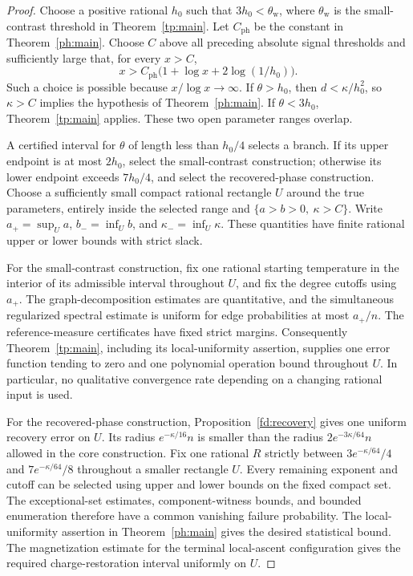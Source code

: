 \documentclass[11pt]{article}
\numberwithin{equation}{section}
\begin{document}
\begin{proof}
Choose a positive rational $h_0$ such that $3h_0<\theta_{\mathrm w}$, where $\theta_{\mathrm w}$ is the small-contrast threshold in Theorem~\ref{tp:main}. Let $C_{\mathrm{ph}}$ be the constant in Theorem~\ref{ph:main}. Choose $C$ above all preceding absolute signal thresholds and sufficiently large that, for every $x>C$,
\[
 x>C_{\mathrm{ph}}\big(1+\log x+2\log(1/h_0)\big).
\]
Such a choice is possible because $x/\log x\to\infty$. If $\theta>h_0$, then $d<\kappa/h_0^2$, so $\kappa>C$ implies the hypothesis of Theorem~\ref{ph:main}. If $\theta<3h_0$, Theorem~\ref{tp:main} applies. These two open parameter ranges overlap.

A certified interval for $\theta$ of length less than $h_0/4$ selects a branch. If its upper endpoint is at most $2h_0$, select the small-contrast construction; otherwise its lower endpoint exceeds $7h_0/4$, and select the recovered-phase construction. Choose a sufficiently small compact rational rectangle $U$ around the true parameters, entirely inside the selected range and $\{a>b>0,\ \kappa>C\}$. Write $a_+=\sup_U a$, $b_-=\inf_U b$, and $\kappa_-=\inf_U\kappa$. These quantities have finite rational upper or lower bounds with strict slack.

For the small-contrast construction, fix one rational starting temperature in the interior of its admissible interval throughout $U$, and fix the degree cutoffs using $a_+$. The graph-decomposition estimates are quantitative, and the simultaneous regularized spectral estimate \cite[Theorem~2.1]{LLV17} is uniform for edge probabilities at most $a_+/n$. The reference-measure certificates have fixed strict margins. Consequently Theorem~\ref{tp:main}, including its local-uniformity assertion, supplies one error function tending to zero and one polynomial operation bound throughout $U$. In particular, no qualitative convergence rate depending on a changing rational input is used.

For the recovered-phase construction, Proposition~\ref{fd:recovery} gives one uniform recovery error on $U$. Its radius $e^{-\kappa/16}n$ is smaller than the radius $2e^{-3\kappa/64}n$ allowed in the core construction. Fix one rational $R$ strictly between $3e^{-\kappa/64}/4$ and $7e^{-\kappa/64}/8$ throughout a smaller rectangle $U$. Every remaining exponent and cutoff can be selected using upper and lower bounds on the fixed compact set. The exceptional-set estimates, component-witness bounds, and bounded enumeration therefore have a common vanishing failure probability. The local-uniformity assertion in Theorem~\ref{ph:main} gives the desired statistical bound. The magnetization estimate for the terminal local-ascent configuration gives the required charge-restoration interval uniformly on $U$.


\end{proof}
\end{document}
